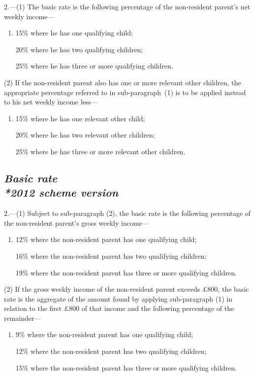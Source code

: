 \documentclass[12pt,a4paper]{article}
\begin{document}
2.---(1) The basic rate is the following percentage of the non-resident parent’s net weekly income—
\begin{enumerate}\item[]
    15\% where he has one qualifying child;

    20\% where he has two qualifying children;

    25\% where he has three or more qualifying children. 
\end{enumerate}

(2) If the non-resident parent also has one or more relevant other children, the appropriate percentage referred to in sub-paragraph~(1)  is to be applied instead to his net weekly income less—
\begin{enumerate}\item[]
    15\% where he has one relevant other child;

    20\% where he has two relevant other children;

    25\% where he has three or more relevant other children. 
\end{enumerate}

\subsection*{\itshape Basic rate\\*\emph{2012 scheme version}}

2.---(1) Subject to sub-paragraph (2), the basic rate is the following percentage of the non-resident parent's gross weekly income—
\begin{enumerate}\item[]
12\% where the non-resident parent has one qualifying child;

16\% where the non-resident parent has two qualifying children;

19\% where the non-resident parent has three or more qualifying children.
\end{enumerate}

(2) If the gross weekly income of the non-resident parent exceeds £800, the basic rate is the aggregate of the amount found by applying sub-paragraph (1) in relation to the first £800 of that income and the following percentage of the remainder—
\begin{enumerate}\item[]
9\% where the non-resident parent has one qualifying child;

12\% where the non-resident parent has two qualifying children;

15\% where the non-resident parent has three or more qualifying children.
\end{enumerate}
\end{document}
